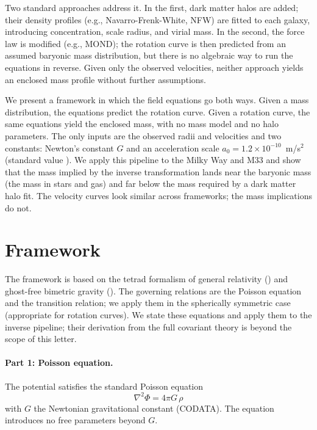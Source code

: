 \documentclass[aps,twocolumn,amsmath,amssymb,reprint,nofootinbib,nobalancelastpage]{revtex4-2}
\begin{document}
Two standard approaches address it. In the first, dark matter halos are added; their density profiles (e.g., Navarro-Frenk-White, NFW) are fitted to each galaxy, introducing concentration, scale radius, and virial mass. In the second, the force law is modified (e.g., MOND); the rotation curve is then predicted from an assumed baryonic mass distribution, but there is no algebraic way to run the equations in reverse. Given only the observed velocities, neither approach yields an enclosed mass profile without further assumptions.

We present a framework in which the field equations go both ways. Given a mass distribution, the equations predict the rotation curve. Given a rotation curve, the same equations yield the enclosed mass, with no mass model and no halo parameters. The only inputs are the observed radii and velocities and two constants: Newton's constant $G$ and an acceleration scale $a_0 = 1.2\times10^{-10}$~m/s$^2$ (standard value \cite{Milgrom83}). We apply this pipeline to the Milky Way and M33 and show that the mass implied by the inverse transformation lands near the baryonic mass (the mass in stars and gas) and far below the mass required by a dark matter halo fit. The velocity curves look similar across frameworks; the mass implications do not.

\section{Framework}
\label{sec:framework}

The framework is based on the tetrad formalism of general relativity (\cite{mtw1973,wald1984}) and ghost-free bimetric gravity (\cite{hassan2012}). The governing relations are the Poisson equation and the transition relation; we apply them in the spherically symmetric case (appropriate for rotation curves). We state these equations and apply them to the inverse pipeline; their derivation from the full covariant theory is beyond the scope of this letter.

\paragraph{Part 1: Poisson equation.}
The potential satisfies the standard Poisson equation
\begin{equation}
\nabla^2 \Phi = 4\pi G\,\rho
\label{eq:poisson}
\end{equation}
with $G$ the Newtonian gravitational constant (CODATA). The equation introduces no free parameters beyond $G$.
\end{document}
